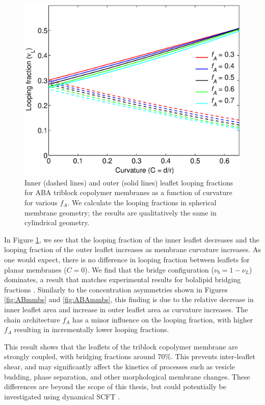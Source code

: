 \documentclass[twocolumn,aps,floatfix,nobibnotes]{revtex4-1}
\begin{document}
\begin{figure}[htp]
\centering
\includegraphics[width=1.0\columnwidth]{loop_fraction.eps}
\caption{Inner (dashed lines) and outer (solid lines) leaflet looping fractions for ABA triblock copolymer membranes as a function of curvature for various $f_A$. We calculate the looping fractions in spherical membrane geometry; the results are qualitatively the same in cylindrical geometry.}
\label{fig:loop_fraction}
\centering
\end{figure}

In Figure \ref{fig:loop_fraction}, we see that the looping fraction of the inner leaflet decreases and the looping fraction of the outer leaflet increases as membrane curvature increases. As one would expect, there is no difference in looping fraction between leaflets for planar membranes ($C = 0$). We find that the bridge configuration ($\nu_b = 1 - \nu_L$) dominates, a result that matches experimental results for bolalipid bridging fractions \cite{thompson1992tetraether,brownholland2009phase,holland2008bolalipid}. Similarly to the concentration asymmetries shown in Figures \ref{fig:ABmmbs} and \ref{fig:ABAmmbs}, this finding is due to the relative decrease in inner leaflet area and increase in outer leaflet area as curvature increases. The chain architecture $f_A$ has a minor influence on the looping fraction, with higher $f_A$ resulting in incrementally lower looping fractions. 

This result shows that the leaflets of the triblock copolymer membrane are strongly coupled, with bridging fractions around 70$\%$. This prevents inter-leaflet shear, and may significantly affect the kinetics of processes such as vesicle budding, phase separation, and other morphological membrane changes. These differences are beyond the scope of this thesis, but could potentially be investigated using dynamical SCFT \cite{grzetic2014statistical}.
\end{document}
